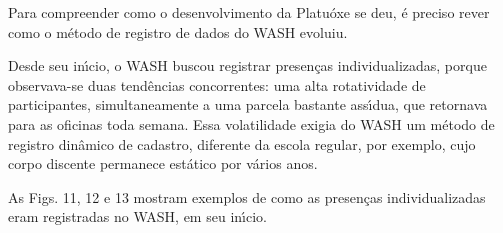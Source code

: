 \documentclass[
12pt,		%
openright,	%
twoside,  %
a4paper,			%
chapter=TITLE,		%
english,			%
french,				%
spanish,			%
brazil				%
]{USPSC-classe/USPSC}
\begin{document}
Para compreender como o desenvolvimento da Platu\'oxe se deu, \'e preciso rever como o m\'etodo de registro de dados do WASH evoluiu.

















Desde seu in\'{\i}cio, o WASH buscou registrar presen\c{c}as individualizadas, porque observava-se duas tend\^encias concorrentes: uma alta rotatividade de participantes, simultaneamente a uma parcela bastante ass\'{\i}dua, que retornava para as oficinas toda semana. Essa volatilidade exigia do WASH um m\'etodo de registro din\^amico de cadastro, diferente da escola regular, por exemplo, cujo corpo discente  permanece est\'atico por v\'arios anos.

















As Figs. 11, 12 e 13 mostram exemplos de como as presen\c{c}as individualizadas eram registradas no WASH, em seu in\'{\i}cio.
\end{document}
